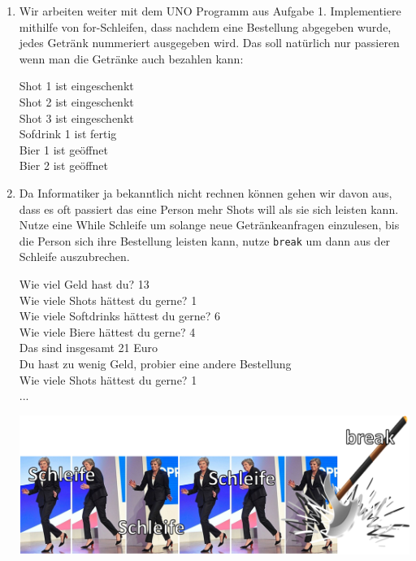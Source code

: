 \documentclass{../../sheet}
\begin{document}
\newpage
{}
\begin{enumerate}
    \item Wir arbeiten weiter mit dem UNO Programm aus Aufgabe 1. Implementiere mithilfe von for-Schleifen, dass nachdem eine Bestellung abgegeben wurde, jedes Getränk nummeriert ausgegeben wird. Das soll natürlich nur passieren wenn man die Getränke auch bezahlen kann:
          \begin{ausgabe}
              Shot 1 ist eingeschenkt\\
              Shot 2 ist eingeschenkt\\
              Shot 3 ist eingeschenkt\\
              Sofdrink 1 ist fertig\\
              Bier 1 ist geöffnet\\
              Bier 2 ist geöffnet
          \end{ausgabe}
    \item Da Informatiker ja bekanntlich nicht rechnen können gehen wir davon aus, dass es oft passiert das eine Person mehr Shots will als sie sich leisten kann. Nutze eine While Schleife um solange neue Getränkeanfragen einzulesen, bis die Person sich ihre Bestellung leisten kann, nutze \texttt{break} um dann aus der Schleife auszubrechen.
    \begin{ausgabe}
        Wie viel Geld hast du? 13\\
        Wie viele Shots hättest du gerne? 1\\
        Wie viele Softdrinks hättest du gerne? 6\\
        Wie viele Biere hättest du gerne? 4\\
        Das sind insgesamt 21 Euro\\
        Du hast zu wenig Geld, probier eine andere Bestellung\\
        Wie viele Shots hättest du gerne? 1\\
        ...
    \end{ausgabe}

    \includegraphics[width=1\linewidth]{../../memes/breakohnerand.png}
\end{enumerate}
\newpage
\end{document}
